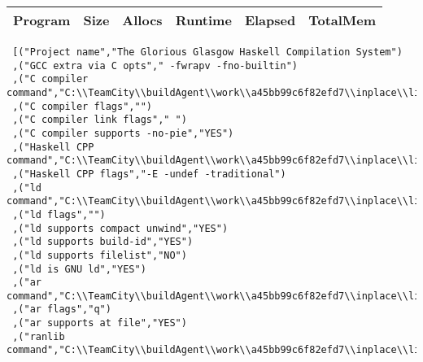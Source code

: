 \begin{tabular}{ c c c c c c }
Program & Size & Allocs & Runtime & Elapsed & TotalMem\\
\hline
\end{tabular}
\begin{verbatim}
 [("Project name","The Glorious Glasgow Haskell Compilation System")
 ,("GCC extra via C opts"," -fwrapv -fno-builtin")
 ,("C compiler command","C:\\TeamCity\\buildAgent\\work\\a45bb99c6f82efd7\\inplace\\lib\\../mingw/bin/gcc.exe")
 ,("C compiler flags","")
 ,("C compiler link flags"," ")
 ,("C compiler supports -no-pie","YES")
 ,("Haskell CPP command","C:\\TeamCity\\buildAgent\\work\\a45bb99c6f82efd7\\inplace\\lib\\../mingw/bin/gcc.exe")
 ,("Haskell CPP flags","-E -undef -traditional")
 ,("ld command","C:\\TeamCity\\buildAgent\\work\\a45bb99c6f82efd7\\inplace\\lib\\../mingw/bin/ld.exe")
 ,("ld flags","")
 ,("ld supports compact unwind","YES")
 ,("ld supports build-id","YES")
 ,("ld supports filelist","NO")
 ,("ld is GNU ld","YES")
 ,("ar command","C:\\TeamCity\\buildAgent\\work\\a45bb99c6f82efd7\\inplace\\lib\\../mingw/bin/ar.exe")
 ,("ar flags","q")
 ,("ar supports at file","YES")
 ,("ranlib command","C:\\TeamCity\\buildAgent\\work\\a45bb99c6f82efd7\\inplace\\lib\\../mingw/bin/ranlib.exe")

\end{verbatim}
